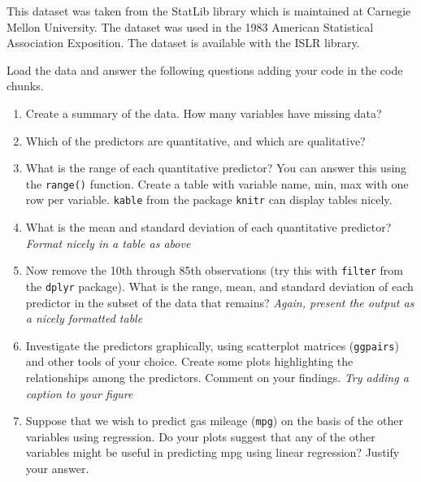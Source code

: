 \documentclass[]{article}
\begin{document}
This dataset was taken from the StatLib library which is maintained at
Carnegie Mellon University. The dataset was used in the 1983 American
Statistical Association Exposition. The dataset is available with the
ISLR library.

Load the data and answer the following questions adding your code in the
code chunks.

\begin{enumerate}
\def\labelenumi{\arabic{enumi}.}
\item
  Create a summary of the data. How many variables have missing data?
\item
  Which of the predictors are quantitative, and which are qualitative?
\item
  What is the range of each quantitative predictor? You can answer this
  using the \texttt{range()} function. Create a table with variable
  name, min, max with one row per variable. \texttt{kable} from the
  package \texttt{knitr} can display tables nicely.
\item
  What is the mean and standard deviation of each quantitative
  predictor? \emph{Format nicely in a table as above}
\item
  Now remove the 10th through 85th observations (try this with
  \texttt{filter} from the \texttt{dplyr} package). What is the range,
  mean, and standard deviation of each predictor in the subset of the
  data that remains? \emph{Again, present the output as a nicely
  formatted table}
\item
  Investigate the predictors graphically, using scatterplot matrices
  (\texttt{ggpairs}) and other tools of your choice. Create some plots
  highlighting the relationships among the predictors. Comment on your
  findings. \emph{Try adding a caption to your figure}
\item
  Suppose that we wish to predict gas mileage (\texttt{mpg}) on the
  basis of the other variables using regression. Do your plots suggest
  that any of the other variables might be useful in predicting mpg
  using linear regression? Justify your answer.
\end{enumerate}
\end{document}
